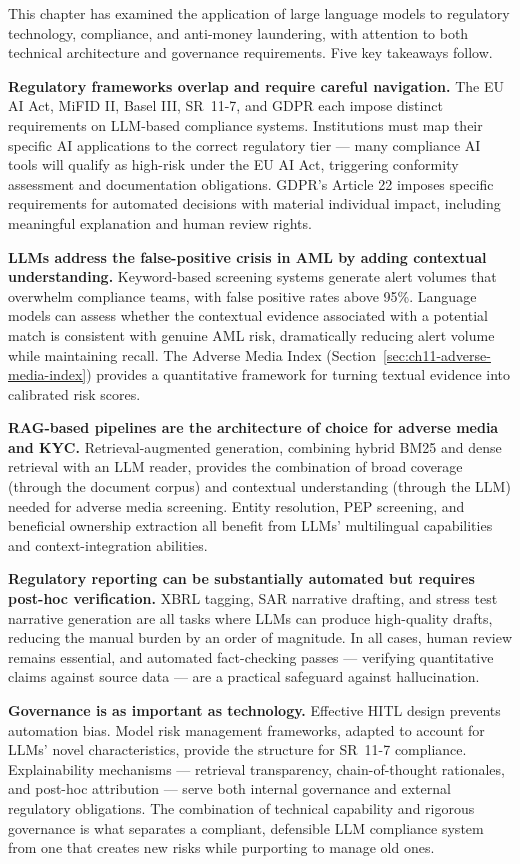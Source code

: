 This chapter has examined the application of large language models to regulatory technology, compliance, and anti-money laundering, with attention to both technical architecture and governance requirements. Five key takeaways follow.

\textbf{Regulatory frameworks overlap and require careful navigation.} The EU AI Act, MiFID II, Basel III, SR~11-7, and GDPR each impose distinct requirements on LLM-based compliance systems. Institutions must map their specific AI applications to the correct regulatory tier --- many compliance AI tools will qualify as high-risk under the EU AI Act, triggering conformity assessment and documentation obligations. GDPR's Article 22 imposes specific requirements for automated decisions with material individual impact, including meaningful explanation and human review rights.

\textbf{LLMs address the false-positive crisis in AML by adding contextual understanding.} Keyword-based screening systems generate alert volumes that overwhelm compliance teams, with false positive rates above 95\%. Language models can assess whether the contextual evidence associated with a potential match is consistent with genuine AML risk, dramatically reducing alert volume while maintaining recall. The Adverse Media Index (Section~\ref{sec:ch11-adverse-media-index}) provides a quantitative framework for turning textual evidence into calibrated risk scores.

\textbf{RAG-based pipelines are the architecture of choice for adverse media and KYC.} Retrieval-augmented generation, combining hybrid BM25 and dense retrieval with an LLM reader, provides the combination of broad coverage (through the document corpus) and contextual understanding (through the LLM) needed for adverse media screening. Entity resolution, PEP screening, and beneficial ownership extraction all benefit from LLMs' multilingual capabilities and context-integration abilities.

\textbf{Regulatory reporting can be substantially automated but requires post-hoc verification.} XBRL tagging, SAR narrative drafting, and stress test narrative generation are all tasks where LLMs can produce high-quality drafts, reducing the manual burden by an order of magnitude. In all cases, human review remains essential, and automated fact-checking passes --- verifying quantitative claims against source data --- are a practical safeguard against hallucination.

\textbf{Governance is as important as technology.} Effective HITL design prevents automation bias. Model risk management frameworks, adapted to account for LLMs' novel characteristics, provide the structure for SR~11-7 compliance. Explainability mechanisms --- retrieval transparency, chain-of-thought rationales, and post-hoc attribution --- serve both internal governance and external regulatory obligations. The combination of technical capability and rigorous governance is what separates a compliant, defensible LLM compliance system from one that creates new risks while purporting to manage old ones.

